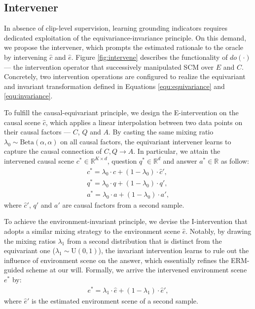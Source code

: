 
\subsection{Intervener}
In absence of clip-level supervision, learning grounding indicators requires dedicated exploitation of the equivariance-invariance principle.
%
On this demand, we propose the intervener, which prompts the estimated rationale to the oracle by intervening $\hat{c}$ and $\hat{e}$. 
%
Figure \ref{fig:intervene} describes the functionality of $do(\cdot)$ --- the intervention operator that successively manipulated SCM over $E$ and $C$. Concretely, two intervention operations are configured to realize the equivariant and invariant transformation defined in Equations \eqref{equ:equivariance} and \eqref{equ:invariance}. 
%

To fulfill the causal-equivariant principle, we design the E-intervention on the causal scene $\hat{c}$, which applies a linear interpolation between two data points on their causal factors --- $C$, $Q$ and $A$.  
By casting the same mixing ratio $\lambda_0\sim\text{Beta}(\alpha,\alpha)$ on all causal factors, the equivariant intervener learns to capture 
the causal connection of $C, Q \to A$.
In particular, we attain the intervened causal scene $c^*\in \mathbb{R}^{K\times d}$, question $q^*\in \mathbb{R}^{d}$ and answer $a^*\in \mathbb{R}$ as follow:
\begin{gather}
    c^*=\lambda_0 \cdot \hat{c}+(1-\lambda_0) \cdot \hat{c}',\\
    q^*=\lambda_0 \cdot q+(1-\lambda_0) \cdot q',\\
    a^*=\lambda_0 \cdot a+(1-\lambda_0) \cdot a',
\end{gather}
where $\hat{c}'$, $q'$ and $a'$ are causal factors from a second sample.

To achieve the environment-invariant principle, we devise the I-intervention that adopts a similar mixing strategy to the environment scene $\hat{e}$. 
%
Notably, by drawing the mixing ratios $\lambda_1$ from a second distribution that is distinct from the equivariant one (\ie $\lambda_1\sim\text{U}(0,1)$), the invariant intervention learns to rule out the influence of environment scene on the answer, which essentially refines the ERM-guided scheme at our will. 
Formally, we arrive the intervened environment scene $e^*$ by:
\begin{gather}
    e^*=\lambda_1 \cdot \hat{e}+(1-\lambda_1) \cdot \hat{e}',
\end{gather}
where $\hat{e}'$ is the estimated environment scene of a second sample.

